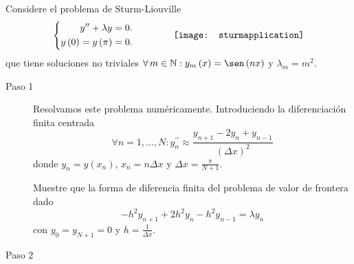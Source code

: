 \question

Considere el problema de Sturm-Liouville
\begin{equation*}
	\left\{
	\begin{aligned}
		y^{\prime\prime}+
		\lambda y         & =
		0.                    \\
		y\left(0\right)=
		y\left(\pi\right) & =
		0.
	\end{aligned}
	\right.\qquad\qquad
	\vcenter{\hbox{\texttt{[image: sturmapplication]}}}
\end{equation*}
que tiene soluciones no triviales
\begin{math}
	\forall m\in\mathbb{N}:
	y_{m}\left(x\right)=
	\sen\left(nx\right)
\end{math}
y $\lambda_{m}=m^{2}$.

\begin{description}
	\item[Paso 1]

	      Resolvamos este problema numéricamente.
	      Introduciendo la diferenciación finita centrada
	      \begin{equation*}
		      \forall n=1,\dotsc,N:
		      y^{\prime\prime}_{n}\approx
		      \frac{y_{n+1}-2y_{n}+y_{n-1}}{\left(\Delta x\right)^{2}}
	      \end{equation*}
	      donde $y_{n}=y\left(x_{n}\right)$, $x_{n}=n\Delta x$ y
	      $\Delta x=\frac{\pi}{N+1}$.

	      Muestre que la forma de diferencia finita del problema de
	      valor de frontera dado
	      \begin{equation*}
		      -h^{2}y_{n+1}+
		      2h^{2}y_{n}-
		      h^{2}y_{n-1}=
		      \lambda y_{n}
	      \end{equation*}
	      con $y_{0}=y_{N+1}=0$ y $h=\frac{1}{\Delta x}$.

	\item[Paso 2]


\end{description}
